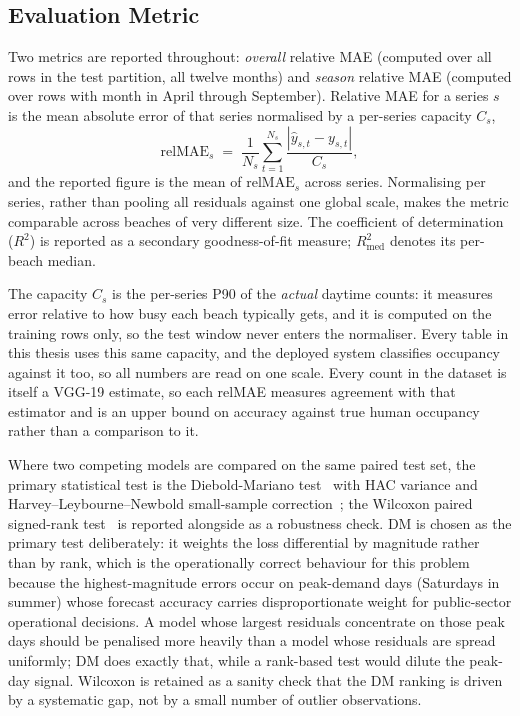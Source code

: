 \documentclass[twocolumn,twoside,a4paper,10pt]{IEEEtran}
\begin{document}
\subsection{Evaluation Metric}\label{sec:metric}

Two metrics are reported throughout: \emph{overall} relative MAE (computed over all rows in the test partition, all twelve months) and \emph{season} relative MAE (computed over rows with month in April through September). Relative MAE for a series $s$ is the mean absolute error of that series normalised by a per-series capacity $C_s$,
\[
  \mathrm{relMAE}_s \;=\; \frac{1}{N_s}\sum_{t=1}^{N_s}\frac{|\hat{y}_{s,t}-y_{s,t}|}{C_s},
\]
and the reported figure is the mean of $\mathrm{relMAE}_s$ across series. Normalising per series, rather than pooling all residuals against one global scale, makes the metric comparable across beaches of very different size. The coefficient of determination ($R^2$) is reported as a secondary goodness-of-fit measure; $R^2_\text{med}$ denotes its per-beach median.

The capacity $C_s$ is the per-series P90 of the \emph{actual} daytime counts: it measures error relative to how busy each beach typically gets, and it is computed on the training rows only, so the test window never enters the normaliser. Every table in this thesis uses this same capacity, and the deployed system classifies occupancy against it too, so all numbers are read on one scale. Every count in the dataset is itself a VGG-19 estimate, so each relMAE measures agreement with that estimator and is an upper bound on accuracy against true human occupancy rather than a comparison to it.

Where two competing models are compared on the same paired test set, the primary statistical test is the Diebold-Mariano test~\cite{DieboldMariano1995} with HAC variance and Harvey--Leybourne--Newbold small-sample correction~\cite{Harvey1997DM}; the Wilcoxon paired signed-rank test~\cite{Wilcoxon1945} is reported alongside as a robustness check. DM is chosen as the primary test deliberately: it weights the loss differential by magnitude rather than by rank, which is the operationally correct behaviour for this problem because the highest-magnitude errors occur on peak-demand days (Saturdays in summer) whose forecast accuracy carries disproportionate weight for public-sector operational decisions. A model whose largest residuals concentrate on those peak days should be penalised more heavily than a model whose residuals are spread uniformly; DM does exactly that, while a rank-based test would dilute the peak-day signal. Wilcoxon is retained as a sanity check that the DM ranking is driven by a systematic gap, not by a small number of outlier observations.
\end{document}
